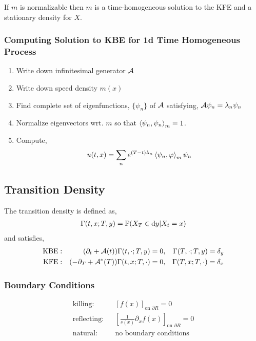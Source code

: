 \documentclass[12pt]{article}
\begin{document}
If \( m \) is normalizable then \( m \) is a time-homogeneous solution to the KFE and a stationary density for \( X \).


\subsubsection{Computing Solution to KBE for 1d Time Homogeneous Process}
\begin{enumerate}[nolistsep]
    \item Write down infinitesimal generator \( \mathcal{A} \)
    \item Write down speed density \( m(x) \)
    \item Find complete set of eigenfunctions, \( \{ \psi_n \} \) of \( \mathcal{A} \) satisfying, \( \mathcal{A} \psi_n = \lambda_n\psi_n \)
    \item Normalize eigenvectors wrt. \( m \) so that \( \left\langle \psi_n,\psi_n \right\rangle_m = 1 \).
    \item Compute,
        \begin{align*}
            u(t,x) = \sum_{n} e^{(T-t)\lambda_n} \left\langle \psi_n,\varphi \right\rangle_m\psi_n
        \end{align*}
\end{enumerate}

\subsection{Transition Density}
The transition density is defined as,
\begin{align*}
    \Gamma(t,x;T,y) = \mathbb{P}(X_T\in\mathrm{d} y | X_t=  x)
\end{align*}
and satisfies,
\begin{align*}
    \text{KBE}: && (\partial_t + \mathcal{A}(t)) \Gamma(t,\cdot;T,y) = 0, && \Gamma(T,\cdot;T,y) = \delta_y \\
    \text{KFE}: && (-\partial_T + \mathcal{A}^*(T)) \Gamma(t,x;T,\cdot) = 0, && \Gamma(T,x;T,\cdot) = \delta_x
\end{align*}

\subsubsection{Boundary Conditions}

\begin{align*}
    \text{killing}: && \left[ f(x) \right]_{\text{on }\partial R} = 0 \\
    \text{reflecting}: && \left[ \frac{1}{s(x)}\partial_x f(x) \right]_{\text{on }\partial R} = 0 \\
    \text{natural}: && \text{no boundary conditions}
\end{align*}
\end{document}
